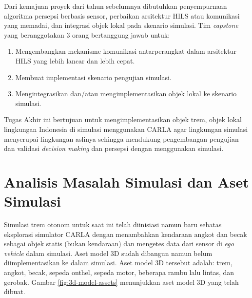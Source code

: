 Dari kemajuan proyek dari tahun sebelumnya dibutuhkan  penyempurnaan algoritma
persepsi berbasis sensor, perbaikan arsitektur HILS atau komunikasi yang
memadai, dan integrasi objek lokal pada skenario simulasi. Tim \textit{capstone}
yang beranggotakan 3 orang bertanggung jawab untuk:

\begin{enumerate}

	\item Mengembangkan mekanisme komunikasi antarperangkat dalam arsitektur
	HILS yang lebih lancar dan lebih cepat.
	\item Membuat implementasi skenario pengujian simulasi.
	\item Mengintegrasikan dan/atau mengimplementasikan objek lokal ke skenario
	simulasi.

\end{enumerate}

Tugas Akhir ini bertujuan untuk mengimplementasikan objek trem, objek lokal
lingkungan Indonesia di simulasi menggunakan CARLA agar lingkungan simulasi
menyerupai lingkungan aslinya sehingga mendukung pengembangan pengujian dan
validasi \textit{decision making} dan persepsi dengan menggunakan simulasi.

\section{Analisis Masalah Simulasi dan Aset Simulasi}

Simulasi trem otonom untuk saat ini telah diinisiasi namun baru sebatas
eksplorasi simulator CARLA dengan menambahkan kendaraan angkot dan becak sebagai
objek statis (bukan kendaraan) dan mengetes data dari sensor di \textit{ego
vehicle} dalam simulasi. Aset model 3D sudah dibangun namun belum
diimplementasikan ke dalam simulasi. Aset model 3D tersebut adalah: trem,
angkot, becak, sepeda onthel, sepeda motor, beberapa rambu lalu lintas, dan
gerobak. Gambar \ref{fig:3d-model-assets} menunjukkan aset model 3D yang telah
dibuat.

